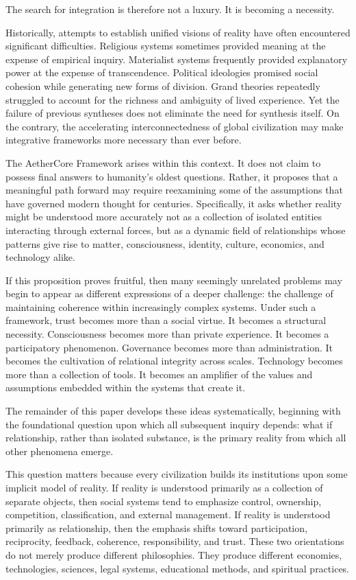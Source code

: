 \documentclass[12pt]{article}
\begin{document}
The search for integration is therefore not a luxury. It is becoming a necessity.

Historically, attempts to establish unified visions of reality have often encountered significant difficulties. Religious systems sometimes provided meaning at the expense of empirical inquiry. Materialist systems frequently provided explanatory power at the expense of transcendence. Political ideologies promised social cohesion while generating new forms of division. Grand theories repeatedly struggled to account for the richness and ambiguity of lived experience. Yet the failure of previous syntheses does not eliminate the need for synthesis itself. On the contrary, the accelerating interconnectedness of global civilization may make integrative frameworks more necessary than ever before.

The AetherCore Framework arises within this context. It does not claim to possess final answers to humanity's oldest questions. Rather, it proposes that a meaningful path forward may require reexamining some of the assumptions that have governed modern thought for centuries. Specifically, it asks whether reality might be understood more accurately not as a collection of isolated entities interacting through external forces, but as a dynamic field of relationships whose patterns give rise to matter, consciousness, identity, culture, economics, and technology alike.

If this proposition proves fruitful, then many seemingly unrelated problems may begin to appear as different expressions of a deeper challenge: the challenge of maintaining coherence within increasingly complex systems. Under such a framework, trust becomes more than a social virtue. It becomes a structural necessity. Consciousness becomes more than private experience. It becomes a participatory phenomenon. Governance becomes more than administration. It becomes the cultivation of relational integrity across scales. Technology becomes more than a collection of tools. It becomes an amplifier of the values and assumptions embedded within the systems that create it.

The remainder of this paper develops these ideas systematically, beginning with the foundational question upon which all subsequent inquiry depends: what if relationship, rather than isolated substance, is the primary reality from which all other phenomena emerge.

This question matters because every civilization builds its institutions upon some implicit model of reality. If reality is understood primarily as a collection of separate objects, then social systems tend to emphasize control, ownership, competition, classification, and external management. If reality is understood primarily as relationship, then the emphasis shifts toward participation, reciprocity, feedback, coherence, responsibility, and trust. These two orientations do not merely produce different philosophies. They produce different economies, technologies, sciences, legal systems, educational methods, and spiritual practices.
\end{document}
